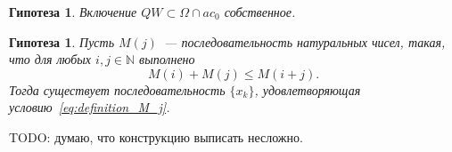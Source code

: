 \documentclass[a4paper,14pt]{article} %
\theoremstyle{plain}
\newtheorem{hypothesis}[lemma]{Гипотеза}
\begin{document}
\begin{hypothesis}
	Включение $QW\subset \Omega\cap ac_0$ собственное.
\end{hypothesis}

\begin{hypothesis}
	Пусть $M(j)$~--- последовательность натуральных чисел, такая,
	что для любых $i,j\in\mathbb{N}$ выполнено
	\begin{equation}
		M(i)+M(j) \leq M(i+j)
		.
	\end{equation}
	Тогда существует последовательность $\{x_k\}$,
	удовлетворяющая условию~\eqref{eq:definition_M_j}.
\end{hypothesis}
TODO: думаю, что конструкцию выписать несложно.


\printbibliography
\end{document}
